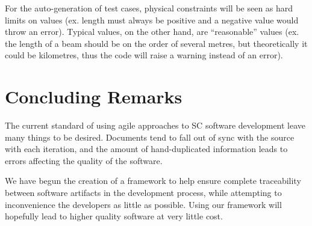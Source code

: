 \documentclass{sig-alternate-05-2015}
\begin{document}
For the auto-generation of test cases, physical constraints will be seen as hard
limits on values (ex. length must always be positive and a negative value would
throw an error). Typical values, on the other hand, are ``reasonable'' values
(ex. the length of a beam should be on the order of several metres, but
theoretically it could be kilometres, thus the code will raise a warning instead
of an error).

    
\section{Concluding Remarks} \label{sec:conclusion}

The current standard of using agile approaches to SC software development leave
many things to be desired. Documents tend to fall out of sync with the source
with each iteration, and the amount of hand-duplicated information leads to
errors affecting the quality of the software.

We have begun the creation of a framework to help ensure complete traceability
between software artifacts in the development process, while attempting to
inconvenience the developers as little as possible. Using our framework will
hopefully lead to higher quality software at very little cost.



  
\end{document}
